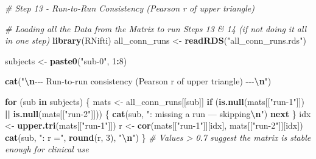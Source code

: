 \documentclass[
]{article}
\newenvironment{Shaded}{\begin{snugshade}}{\end{snugshade}}
\newcommand{\CommentTok}[1]{\textcolor[rgb]{0.56,0.35,0.01}{\textit{#1}}}
\newcommand{\ControlFlowTok}[1]{\textcolor[rgb]{0.13,0.29,0.53}{\textbf{#1}}}
\newcommand{\DecValTok}[1]{\textcolor[rgb]{0.00,0.00,0.81}{#1}}
\newcommand{\FunctionTok}[1]{\textcolor[rgb]{0.13,0.29,0.53}{\textbf{#1}}}
\newcommand{\NormalTok}[1]{#1}
\newcommand{\OtherTok}[1]{\textcolor[rgb]{0.56,0.35,0.01}{#1}}
\newcommand{\SpecialCharTok}[1]{\textcolor[rgb]{0.81,0.36,0.00}{\textbf{#1}}}
\newcommand{\StringTok}[1]{\textcolor[rgb]{0.31,0.60,0.02}{#1}}
\begin{document}
\begin{Shaded}
\begin{Highlighting}[]
\CommentTok{\# Step 13 {-} Run{-}to{-}Run Consistency (Pearson r of upper triangle)}

\CommentTok{\# Loading all the Data from the Matrix to run Steps 13 \& 14 (if not doing it all in one step)}
\FunctionTok{library}\NormalTok{(RNifti)}
\NormalTok{all\_conn\_runs }\OtherTok{\textless{}{-}} \FunctionTok{readRDS}\NormalTok{(}\StringTok{"all\_conn\_runs.rds"}\NormalTok{)}

\NormalTok{subjects }\OtherTok{\textless{}{-}} \FunctionTok{paste0}\NormalTok{(}\StringTok{"sub{-}0"}\NormalTok{, }\DecValTok{1}\SpecialCharTok{:}\DecValTok{8}\NormalTok{)}

\FunctionTok{cat}\NormalTok{(}\StringTok{"}\SpecialCharTok{\textbackslash{}n}\StringTok{{-}{-}{-} Run{-}to{-}run consistency (Pearson r of upper triangle) {-}{-}{-}}\SpecialCharTok{\textbackslash{}n}\StringTok{"}\NormalTok{)}

\ControlFlowTok{for}\NormalTok{ (sub }\ControlFlowTok{in}\NormalTok{ subjects) \{}
\NormalTok{  mats }\OtherTok{\textless{}{-}}\NormalTok{ all\_conn\_runs[[sub]]}
  \ControlFlowTok{if}\NormalTok{ (}\FunctionTok{is.null}\NormalTok{(mats[[}\StringTok{"run{-}1"}\NormalTok{]]) }\SpecialCharTok{||} \FunctionTok{is.null}\NormalTok{(mats[[}\StringTok{"run{-}2"}\NormalTok{]])) \{}
    \FunctionTok{cat}\NormalTok{(sub, }\StringTok{": missing a run — skipping}\SpecialCharTok{\textbackslash{}n}\StringTok{"}\NormalTok{)}
    \ControlFlowTok{next}
\NormalTok{  \}}
\NormalTok{  idx }\OtherTok{\textless{}{-}} \FunctionTok{upper.tri}\NormalTok{(mats[[}\StringTok{"run{-}1"}\NormalTok{]])}
\NormalTok{  r   }\OtherTok{\textless{}{-}} \FunctionTok{cor}\NormalTok{(mats[[}\StringTok{"run{-}1"}\NormalTok{]][idx], mats[[}\StringTok{"run{-}2"}\NormalTok{]][idx])}
  \FunctionTok{cat}\NormalTok{(sub, }\StringTok{": r ="}\NormalTok{, }\FunctionTok{round}\NormalTok{(r, }\DecValTok{3}\NormalTok{), }\StringTok{"}\SpecialCharTok{\textbackslash{}n}\StringTok{"}\NormalTok{)}
\NormalTok{\}}
\CommentTok{\# Values \textgreater{} 0.7 suggest the matrix is stable enough for clinical use}
\end{Highlighting}
\end{Shaded}
\end{document}
